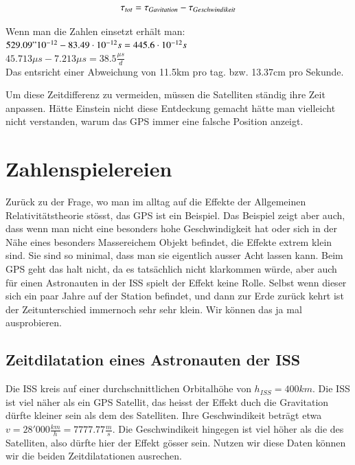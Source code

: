 \begin{refsection}
\begin{equation}
\tau_{tot} = \tau_{Gavitation} - \tau_{Geschwindikeit}\\
\end{equation}

\noindent{}Wenn man die Zahlen einsetzt erhält man:\\

\(  529.09 "10^{-12}  -  83.49 \cdot 10^{-12}s =  445.6 \cdot 10^{-12}s  \) \\

\(  45.713\mu{}s - 7.213\mu{}s = 38.5\frac{\mu{}s}{d} \) \\

\noindent{}Das entsricht einer Abweichung von 11.5km pro tag. bzw. 13.37cm pro Sekunde. 

Um diese Zeitdifferenz zu vermeiden, müssen die Satelliten ständig ihre Zeit anpassen. Hätte Einstein nicht diese Entdeckung gemacht hätte man vielleicht nicht verstanden, warum das GPS immer eine falsche Position anzeigt. 

\section{Zahlenspielereien}
Zurück zu der Frage, wo man im alltag auf die Effekte der Allgemeinen Relativitätstheorie stösst, das GPS ist ein Beispiel. Das Beispiel zeigt aber auch, dass wenn man nicht eine besonders hohe Geschwindigkeit hat oder sich in der Nähe eines besonders Massereichem Objekt befindet, die Effekte extrem klein sind. Sie sind so minimal, dass man sie eigentlich ausser Acht lassen kann. Beim GPS geht das halt nicht, da es tatsächlich nicht klarkommen würde, aber auch für einen Astronauten in der ISS spielt der Effekt keine Rolle. Selbst wenn dieser sich ein paar Jahre auf der Station befindet, und dann zur Erde zurück kehrt ist der Zeitunterschied immernoch sehr sehr klein. Wir können das ja mal ausprobieren.

\subsection{Zeitdilatation eines Astronauten der ISS}
Die ISS kreis auf einer durchschnittlichen Orbitalhöhe von \( h_{ISS} = 400km \). Die ISS ist viel näher als ein GPS Satellit, das heisst der Effekt duch die Gravitation dürfte kleiner sein als dem des Satelliten. Ihre Geschwindikeit beträgt etwa \( v = 28'000\frac{km}{h} = 7777.77\frac{m}{s} \). Die Geschwindikeit hingegen ist viel höher als die des Satelliten, also dürfte hier der Effekt gösser sein. Nutzen wir diese Daten können wir die beiden Zeitdilatationen ausrechen.\\


\end{refsection}
